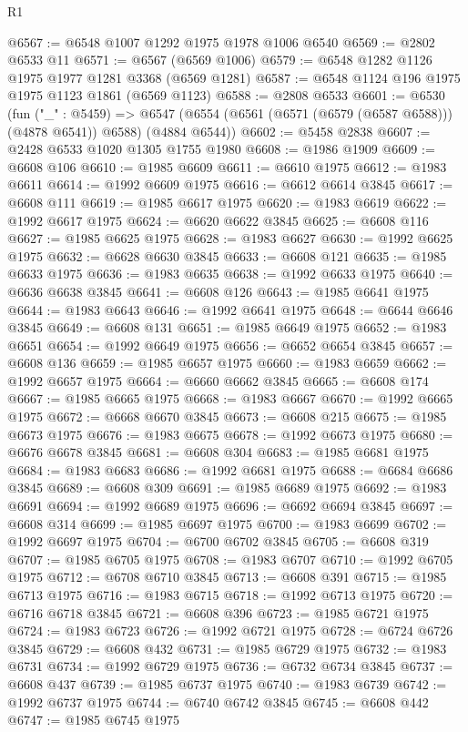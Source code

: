 \begin{lexlean}{R1}
\begin{coremodule}
@6567 := @6548 @1007 @1292 @1975 @1978 @1006 @6540
@6569 := @2802 @6533 @11
@6571 := @6567 (@6569 @1006)
@6579 := @6548 @1282 @1126 @1975 @1977 @1281 @3368 (@6569 @1281)
@6587 := @6548 @1124 @196 @1975 @1975 @1123 @1861 (@6569 @1123)
@6588 := @2808 @6533
@6601 := @6530
    (fun ("_" : @5459) =>
    @6547 (@6554 (@6561 (@6571 (@6579 (@6587 @6588))) (@4878 @6541)) @6588) (@4884 @6544))
@6602 := @5458 @2838
@6607 := @2428 @6533 @1020 @1305 @1755 @1980
@6608 := @1986 @1909
@6609 := @6608 @106
@6610 := @1985 @6609
@6611 := @6610 @1975
@6612 := @1983 @6611
@6614 := @1992 @6609 @1975
@6616 := @6612 @6614 @3845
@6617 := @6608 @111
@6619 := @1985 @6617 @1975
@6620 := @1983 @6619
@6622 := @1992 @6617 @1975
@6624 := @6620 @6622 @3845
@6625 := @6608 @116
@6627 := @1985 @6625 @1975
@6628 := @1983 @6627
@6630 := @1992 @6625 @1975
@6632 := @6628 @6630 @3845
@6633 := @6608 @121
@6635 := @1985 @6633 @1975
@6636 := @1983 @6635
@6638 := @1992 @6633 @1975
@6640 := @6636 @6638 @3845
@6641 := @6608 @126
@6643 := @1985 @6641 @1975
@6644 := @1983 @6643
@6646 := @1992 @6641 @1975
@6648 := @6644 @6646 @3845
@6649 := @6608 @131
@6651 := @1985 @6649 @1975
@6652 := @1983 @6651
@6654 := @1992 @6649 @1975
@6656 := @6652 @6654 @3845
@6657 := @6608 @136
@6659 := @1985 @6657 @1975
@6660 := @1983 @6659
@6662 := @1992 @6657 @1975
@6664 := @6660 @6662 @3845
@6665 := @6608 @174
@6667 := @1985 @6665 @1975
@6668 := @1983 @6667
@6670 := @1992 @6665 @1975
@6672 := @6668 @6670 @3845
@6673 := @6608 @215
@6675 := @1985 @6673 @1975
@6676 := @1983 @6675
@6678 := @1992 @6673 @1975
@6680 := @6676 @6678 @3845
@6681 := @6608 @304
@6683 := @1985 @6681 @1975
@6684 := @1983 @6683
@6686 := @1992 @6681 @1975
@6688 := @6684 @6686 @3845
@6689 := @6608 @309
@6691 := @1985 @6689 @1975
@6692 := @1983 @6691
@6694 := @1992 @6689 @1975
@6696 := @6692 @6694 @3845
@6697 := @6608 @314
@6699 := @1985 @6697 @1975
@6700 := @1983 @6699
@6702 := @1992 @6697 @1975
@6704 := @6700 @6702 @3845
@6705 := @6608 @319
@6707 := @1985 @6705 @1975
@6708 := @1983 @6707
@6710 := @1992 @6705 @1975
@6712 := @6708 @6710 @3845
@6713 := @6608 @391
@6715 := @1985 @6713 @1975
@6716 := @1983 @6715
@6718 := @1992 @6713 @1975
@6720 := @6716 @6718 @3845
@6721 := @6608 @396
@6723 := @1985 @6721 @1975
@6724 := @1983 @6723
@6726 := @1992 @6721 @1975
@6728 := @6724 @6726 @3845
@6729 := @6608 @432
@6731 := @1985 @6729 @1975
@6732 := @1983 @6731
@6734 := @1992 @6729 @1975
@6736 := @6732 @6734 @3845
@6737 := @6608 @437
@6739 := @1985 @6737 @1975
@6740 := @1983 @6739
@6742 := @1992 @6737 @1975
@6744 := @6740 @6742 @3845
@6745 := @6608 @442
@6747 := @1985 @6745 @1975

\end{coremodule}
\end{lexlean}
